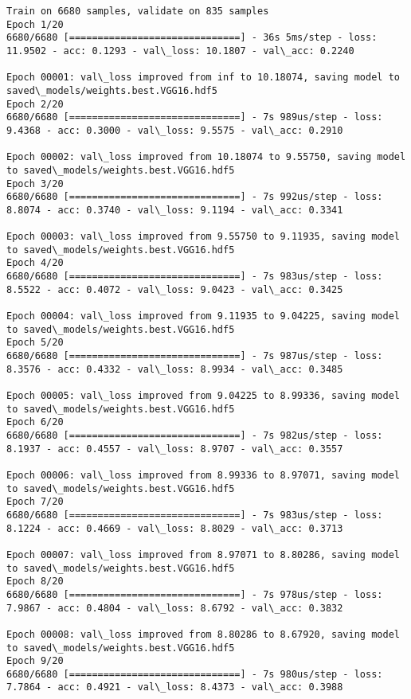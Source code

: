 \documentclass[11pt]{article}
\begin{document}
    \begin{Verbatim}[commandchars=\\\{\}]
Train on 6680 samples, validate on 835 samples
Epoch 1/20
6680/6680 [==============================] - 36s 5ms/step - loss: 11.9502 - acc: 0.1293 - val\_loss: 10.1807 - val\_acc: 0.2240

Epoch 00001: val\_loss improved from inf to 10.18074, saving model to saved\_models/weights.best.VGG16.hdf5
Epoch 2/20
6680/6680 [==============================] - 7s 989us/step - loss: 9.4368 - acc: 0.3000 - val\_loss: 9.5575 - val\_acc: 0.2910

Epoch 00002: val\_loss improved from 10.18074 to 9.55750, saving model to saved\_models/weights.best.VGG16.hdf5
Epoch 3/20
6680/6680 [==============================] - 7s 992us/step - loss: 8.8074 - acc: 0.3740 - val\_loss: 9.1194 - val\_acc: 0.3341

Epoch 00003: val\_loss improved from 9.55750 to 9.11935, saving model to saved\_models/weights.best.VGG16.hdf5
Epoch 4/20
6680/6680 [==============================] - 7s 983us/step - loss: 8.5522 - acc: 0.4072 - val\_loss: 9.0423 - val\_acc: 0.3425

Epoch 00004: val\_loss improved from 9.11935 to 9.04225, saving model to saved\_models/weights.best.VGG16.hdf5
Epoch 5/20
6680/6680 [==============================] - 7s 987us/step - loss: 8.3576 - acc: 0.4332 - val\_loss: 8.9934 - val\_acc: 0.3485

Epoch 00005: val\_loss improved from 9.04225 to 8.99336, saving model to saved\_models/weights.best.VGG16.hdf5
Epoch 6/20
6680/6680 [==============================] - 7s 982us/step - loss: 8.1937 - acc: 0.4557 - val\_loss: 8.9707 - val\_acc: 0.3557

Epoch 00006: val\_loss improved from 8.99336 to 8.97071, saving model to saved\_models/weights.best.VGG16.hdf5
Epoch 7/20
6680/6680 [==============================] - 7s 983us/step - loss: 8.1224 - acc: 0.4669 - val\_loss: 8.8029 - val\_acc: 0.3713

Epoch 00007: val\_loss improved from 8.97071 to 8.80286, saving model to saved\_models/weights.best.VGG16.hdf5
Epoch 8/20
6680/6680 [==============================] - 7s 978us/step - loss: 7.9867 - acc: 0.4804 - val\_loss: 8.6792 - val\_acc: 0.3832

Epoch 00008: val\_loss improved from 8.80286 to 8.67920, saving model to saved\_models/weights.best.VGG16.hdf5
Epoch 9/20
6680/6680 [==============================] - 7s 980us/step - loss: 7.7864 - acc: 0.4921 - val\_loss: 8.4373 - val\_acc: 0.3988


\end{Verbatim}
\end{document}
